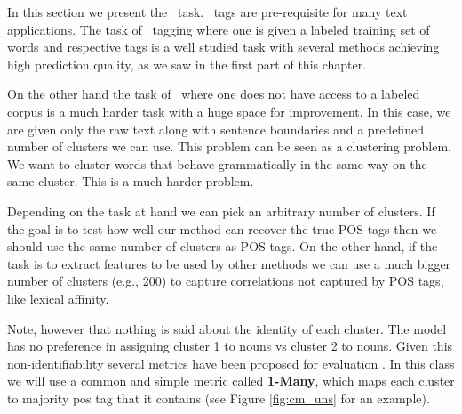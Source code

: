 In this section we present the \posi\ task. \pos\ tags are pre-requisite for many text applications. The task of \pos\ tagging where one is given a labeled training set of words and respective tags is a well studied task with several methods achieving high prediction quality, as we saw in the first part of this chapter. %

On the other hand the task of \posi\ where one does not have access to a labeled corpus is a much harder task with a huge space for improvement. In this case, we are given only the raw text along with sentence boundaries and a predefined number of clusters we can use. This problem can be seen as a clustering problem. We want to cluster words that behave grammatically in the same way on the same cluster. This is a much harder problem.

%
Depending on the task at hand we can pick an arbitrary number of clusters. If the goal is to test how well our method can recover the true POS tags then we should use the same number of clusters as POS tags. On the other hand, if the task is to extract features to be used by other methods we can use a much bigger number of clusters (e.g., 200) to capture correlations not captured by POS tags, like lexical affinity. 

Note, however that nothing is said about the identity of each cluster. The model has no preference in assigning cluster 1 to nouns vs cluster 2 to nouns. Given this non-identifiability several metrics have been proposed for evaluation \citep{Reichart09,haghighi2006naacl,Meila07,RosenbergH07}. In this class we will use a common and simple metric called \textbf{1-Many}, which maps each cluster to majority pos tag that it contains (see Figure \ref{fig:cm_uns} for an example). 

